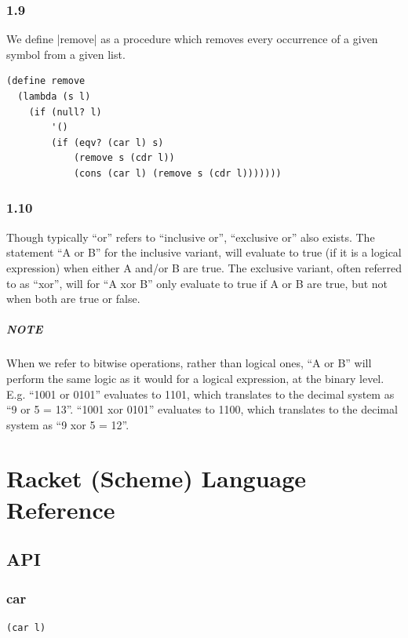 \documentclass[a4paper]{article}
\begin{document}
\subsubsection*{1.9}

We define |remove| as a procedure which removes every occurrence of a given symbol from a given list.

\begin{lstlisting}
(define remove
  (lambda (s l)
    (if (null? l)
        '()
        (if (eqv? (car l) s)
            (remove s (cdr l))
            (cons (car l) (remove s (cdr l)))))))
\end{lstlisting}

\subsubsection*{1.10}

Though typically ``or'' refers to ``inclusive or'', ``exclusive or'' also exists. The statement ``A or B'' for the inclusive variant, will evaluate to true (if it is a logical expression) when either A and/or B are true. The exclusive variant, often referred to as ``xor'', will for ``A xor B'' only evaluate to true if A or B are true, but not when both are true or false.

\subparagraph{NOTE} When we refer to bitwise operations, rather than logical ones, ``A or B'' will perform the same logic as it would for a logical expression, at the binary level. E.g. ``1001 or 0101'' evaluates to 1101, which translates to the decimal system as ``9 or 5 = 13''. ``1001 xor 0101'' evaluates to 1100, which translates to the decimal system as ``9 xor 5 = 12''.

\newpage

\section{Racket (Scheme) Language Reference}

\subsection{API}

\subsubsection{car}

\begin{lstlisting}[frame=none]
(car l)
\end{lstlisting}
\end{document}
